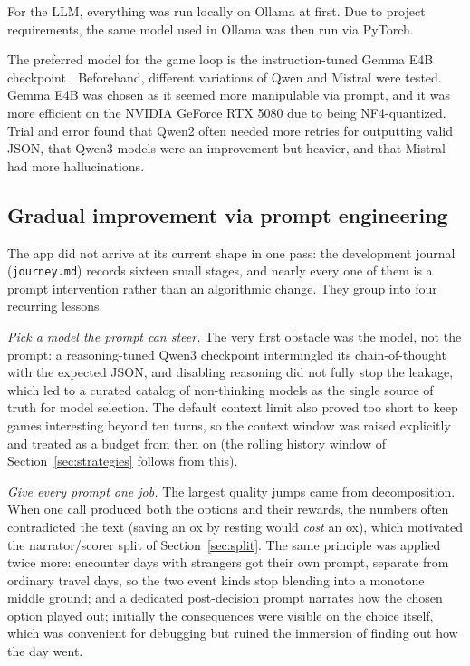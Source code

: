 \documentclass{article}
\begin{document}
For the LLM, everything was run locally on Ollama at first.
Due to project requirements, the same model used in Ollama was then run via PyTorch.

The preferred model for the game loop is the instruction-tuned Gemma E4B checkpoint
\citep{gemmateam2024gemma}.
Beforehand, different variations of Qwen and Mistral were tested.
Gemma E4B was chosen as it seemed more manipulable via prompt, and it was more efficient
on the NVIDIA GeForce RTX 5080 due to being NF4-quantized.
Trial and error found that Qwen2 often needed more retries for outputting valid JSON, that
Qwen3 models were an improvement but heavier, and that Mistral had more hallucinations.

\subsection{Gradual improvement via prompt engineering}
\label{sec:improvements}

The app did not arrive at its current shape in one pass: the development journal
(\texttt{journey.md}) records sixteen small stages, and nearly every one of them is a
prompt intervention rather than an algorithmic change. They group into four recurring
lessons.

\emph{Pick a model the prompt can steer.} The very first obstacle was the model, not the
prompt: a reasoning-tuned Qwen3 checkpoint intermingled its chain-of-thought with the
expected JSON, and disabling reasoning did not fully stop the leakage, which led to a
curated catalog of non-thinking models as the single source of truth for model selection.
The default context limit also proved too short to keep games interesting beyond ten
turns, so the context window was raised explicitly and treated as a budget from then on
(the rolling history window of Section~\ref{sec:strategies} follows from this).

\emph{Give every prompt one job.} The largest quality jumps came from decomposition. When
one call produced both the options and their rewards, the numbers often contradicted the
text (saving an ox by resting would \emph{cost} an ox), which motivated the
narrator/scorer split of Section~\ref{sec:split}. The same principle was applied twice
more: encounter days with strangers got their own prompt, separate from ordinary travel
days, so the two event kinds stop blending into a monotone middle ground; and a dedicated
post-decision prompt narrates how the chosen option played out; initially the
consequences were visible on the choice itself, which was convenient for debugging but
ruined the immersion of finding out how the day went.
\end{document}
